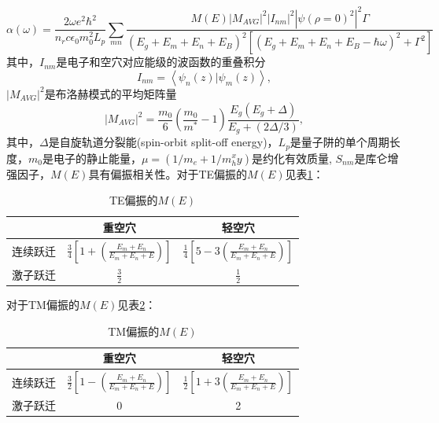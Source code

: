 \begin{equation}
\label{Equ:excitonabs}
\alpha(\omega) = \frac{2\omega e^2 \hbar^2}{n_r c \epsilon_0 m_0^2 L_p} \sum_{mn}\frac{M(E)|M_{AVG}|^2|I_{nm}|^2|\psi(\rho = 0)^2|^2\Gamma}{(E_g+E_m+E_n+E_B)^2[(E_g+E_m+E_n+E_B-\hbar\omega)^2+\Gamma^2]}
\end{equation}
其中，$I_{nm}$是电子和空穴对应能级的波函数的重叠积分
\begin{equation}
\label{Equ:Imn}
I_{nm} = \left< \psi_n(z)|\psi_m(z)\right>,
\end{equation}
$|M_{AVG}| ^2$是布洛赫模式的平均矩阵量
\begin{equation}
\label{Equ:MAVG}
\left| M_{AVG} \right| ^2 = \frac{m_0}{6} \left( \frac{m_0}{m^*}-1\right)\frac{E_g(E_g+\Delta)}{E_g+(2\Delta/3)},
\end{equation}
其中，$\Delta$是自旋轨道分裂能(spin-orbit split-off energy)，$L_p$是量子阱的单个周期长度，$m_0$是电子的静止能量，$\mu = (1/m_e+1/m_{h}^xy)$是约化有效质量, $S_{nm}$是库仑增强因子，$M(E)$具有偏振相关性\cite{chuang1991exciton, yamanishi1984comment, asada1984gain}。对于TE偏振的$M(E)$见表\ref{METE}：
{
	\begin{table}[htb]
		\caption{TE偏振的$M(E)$}
		\label{METE}
		\centering
		\begin{tabular}[t]{p{3cm}cc}
			\hline
			     & 重空穴 & 轻空穴 \\
			\hline
			连续跃迁  & $\frac{3}{4} \left[ 1+ \left( \frac{E_m + E_n}{E_m+E_n+E}\right)\right]$ & $\frac{1}{4} \left[ 5-3 \left( \frac{E_m + E_n}{E_m+E_n+E}\right)\right]$ \\
			激子跃迁  & $\frac{3}{2}$ & $\frac{1}{2}$\\
			\hline
		\end{tabular}
	\end{table}
}

对于TM偏振的$M(E)$见表\ref{METM}：
{
	\begin{table}[htb]
		\caption{TM偏振的$M(E)$}
		\label{METM}
		\centering
		\begin{tabular}[t]{p{3cm}cc}
			\hline
			& 重空穴 & 轻空穴 \\
			\hline
			连续跃迁  & $\frac{3}{2} \left[ 1- \left( \frac{E_m + E_n}{E_m+E_n+E}\right)\right]$ & $\frac{1}{2} \left[ 1+3 \left( \frac{E_m + E_n}{E_m+E_n+E}\right)\right]$ \\
			激子跃迁  & 0 & 2\\
			\hline
		\end{tabular}
	\end{table}
}

